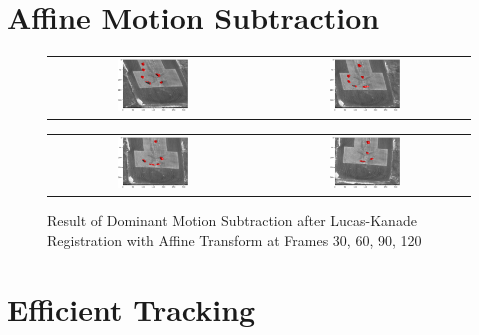 \documentclass[a4paper]{article}
\begin{document}
\section{Affine Motion Subtraction}
\begin{figure}[!ht]
\centering
\begin{tabular}{cc}
{\includegraphics[width=0.35\textwidth]{images/aerialseq_30}} &
{\includegraphics[width=0.35\textwidth]{images/aerialseq_60}}
\end{tabular}
\begin{tabular}{cc}
{\includegraphics[width=0.35\textwidth]{images/aerialseq_90}} &
{\includegraphics[width=0.35\textwidth]{images/aerialseq_120}}
\end{tabular}
\caption{Result of Dominant Motion Subtraction after Lucas-Kanade Registration with Affine Transform at Frames 30, 60, 90, 120}
\end{figure}

\section{Efficient Tracking}
\end{document}
